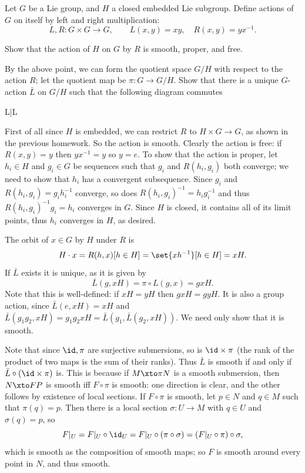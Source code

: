 \def\bK{{\bb K}}

\bprob

    Let $G$ be a Lie group, and $H$ a closed embedded Lie subgroup.
    Define actions of $G$ on itself by left and right multiplication:
    $$ L,R\colon G\times G\to G,\qquad L(x,y)=xy,\quad R(x,y)=yx^{-1} . $$
    \benum
        \item Show that the action of $H$ on $G$ by $R$ is smooth, proper, and free.
        \item By the above point, we can form the quotient space $G/H$ with respect to the action $R$; let the quotient map be
        $\pi\colon G\to G/H$.
        Show that there is a unique $G$-action $\bar L$ on $G/H$ such that the following diagram commutes

            {L}{\bar L}{\id\times\pi}{\pi}
    \eenum

\eprob

\benum
    \item First of all since $H$ is embedded, we can restrict $R$ to $H\times G\to G$, as shown in the previous homework.
    So the action is smooth.
    Clearly the action is free: if $R(x,y)=y$ then $yx^{-1}=y$ so $y=e$.
    To show that the action is proper, let $h_i\in H$ and $g_i\in G$ be sequences such that $g_i$ and $R(h_i,g_i)$ both converge; we need to show
    that $h_i$ has a convergent subsequence.
    Since $g_i$ and $R(h_i,g_i)=g_ih_i^{-1}$ converge, so does $R(h_i,g_i)^{-1}=h_ig_i^{-1}$ and thus $R(h_i,g_i)^{-1}g_i=h_i$ converges in $G$.
    Since $H$ is closed, it contains all of its limit points, thus $h_i$ converges in $H$, as desired.

    \item The orbit of $x\in G$ by $H$ under $R$ is
    $$ H\cdot x = {R(h,x)}[h\in H] = \set{xh^{-1}}[h\in H] = xH . $$
    If $\bar L$ exists it is unique, as it is given by
    $$ \bar L(g,xH) = \pi\circ L(g,x) = gxH . $$
    Note that this is well-defined: if $xH=yH$ then $gxH=gyH$.
    It is also a group action, since $\bar L(e,xH)=xH$ and $\bar L(g_1g_2,xH)=g_1g_2xH=\bar L(g_1,\bar L(g_2,xH))$.
    We need only show that it is smooth.

    Note that since $\id,\pi$ are surjective submersions, so is $\id\times\pi$ (the rank of the product of two maps is the sum of their ranks).
    Thus $\bar L$ is smooth if and only if $\bar L\circ(\id\times\pi)$ is.
    This is because if $M\xto\pi N$ is a smooth submersion, then $N\xto FP$ is smooth iff $F\circ\pi$ is smooth: one direction is clear,
    and the other follows by existence of local sections.
    If $F\circ\pi$ is smooth, let $p\in N$ and $q\in M$ such that $\pi(q)=p$.
    Then there is a local section $\sigma\colon U\to M$ with $q\in U$ and $\sigma(q)=p$, so
    $$ F|_U = F|_U\circ\id_U = F|_U\circ(\pi\circ\sigma) = (F|_U\circ\pi)\circ\sigma, $$
    which is smooth as the composition of smooth maps; so $F$ is smooth around every point in $N$, and thus smooth.

